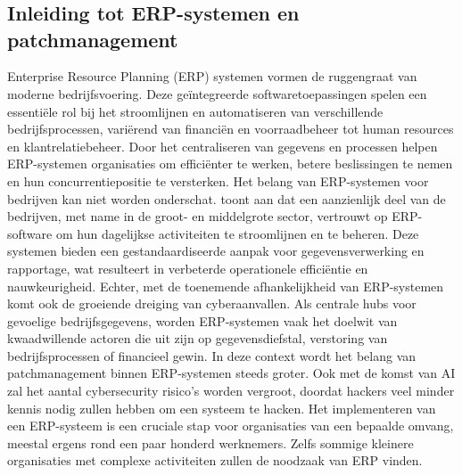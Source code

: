 \chapter{}%
\label{ch:stand-van-zaken}



\section{Inleiding tot ERP-systemen en patchmanagement}
Enterprise Resource Planning (ERP) systemen vormen de ruggengraat van moderne bedrijfsvoering. Deze geïntegreerde softwaretoepassingen spelen een essentiële rol bij het stroomlijnen en automatiseren van verschillende bedrijfsprocessen, variërend van financiën en voorraadbeheer tot human resources en klantrelatiebeheer. Door het centraliseren van gegevens en processen helpen ERP-systemen organisaties om efficiënter te werken, betere beslissingen te nemen en hun concurrentiepositie te versterken.
Het belang van ERP-systemen voor bedrijven kan niet worden onderschat. \textcite{StatistiekVlaanderen2022} toont aan dat een aanzienlijk deel van de bedrijven, met name in de groot- en middelgrote sector, vertrouwt op ERP-software om hun dagelijkse activiteiten te stroomlijnen en te beheren. Deze systemen bieden een gestandaardiseerde aanpak voor gegevensverwerking en rapportage, wat resulteert in verbeterde operationele efficiëntie en nauwkeurigheid.
Echter, met de toenemende afhankelijkheid van ERP-systemen komt ook de groeiende dreiging van cyberaanvallen. Als centrale hubs voor gevoelige bedrijfsgegevens, worden ERP-systemen vaak het doelwit van kwaadwillende actoren die uit zijn op gegevensdiefstal, verstoring van bedrijfsprocessen of financieel gewin. In deze context wordt het belang van patchmanagement binnen ERP-systemen steeds groter. Ook met de komst van AI zal het aantal cybersecurity risico’s worden vergroot, doordat hackers veel minder kennis nodig zullen hebben om een systeem te hacken.  \autocite{Pearson2024}
Het implementeren van een ERP-systeem is een cruciale stap voor organisaties van een bepaalde omvang, meestal ergens rond een paar honderd werknemers. Zelfs sommige kleinere organisaties met complexe activiteiten zullen de noodzaak van ERP vinden.
